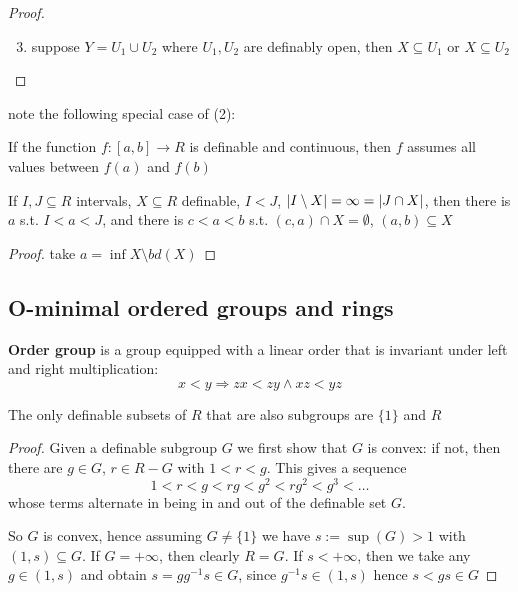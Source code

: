 \documentclass[11pt]{article}
\begin{document}
\begin{proof}
\begin{enumerate}
\setcounter{enumi}{2}
\item suppose \(Y=U_1\cup U_2\) where \(U_1,U_2\) are definably open, then \(X\subseteq U_1\) or \(X\subseteq U_2\)
\end{enumerate}
\end{proof}

note the following special case of (2):
\begin{center}
If the function \(f:[a,b]\to R\) is definable and continuous, then \(f\) assumes all values
between \(f(a)\) and \(f(b)\)
\end{center}

\begin{lemma}[]
If \(I,J\subseteq R\) intervals, \(X\subseteq R\) definable, \(I<J\), \(\abs{I\setminus X}=\infty=\abs{J\cap X}\), then there
is \(a\) s.t. \(I<a<J\), and there is \(c<a<b\) s.t. \((c,a)\cap X=\emptyset\), \((a,b)\subseteq X\)
\end{lemma}

\begin{proof}
take \(a=\inf X\setminus bd(X)\)
\end{proof}
\subsection{O-minimal ordered groups and rings}
\label{sec:org8ea482e}
\textbf{Order group} is a group equipped with a linear order that is invariant under left and right
 multiplication:
 \begin{equation*}
x<y\Rightarrow zx<zy\wedge xz<yz
 \end{equation*}

\begin{lemma}[]
The only definable subsets of \(R\) that are also subgroups are \(\{1\}\) and \(R\)
\end{lemma}

\begin{proof}
Given a definable subgroup \(G\) we first show that \(G\) is convex: if not, then there
are \(g\in G\), \(r\in R-G\) with \(1<r<g\). This gives a sequence
 \begin{equation*}
1<r<g<rg<g^2<rg^2<g^3<\dots
 \end{equation*}
whose terms alternate in being in and out of the definable set \(G\).

So \(G\) is convex, hence assuming \(G\neq\{1\}\) we have \(s:=\sup(G)>1\) with \((1,s)\subseteq G\).
If \(G=+\infty\), then clearly \(R=G\). If \(s<+\infty\), then we take any \(g\in(1,s)\) and
obtain \(s=gg^{-1}s\in G\), since \(g^{-1}s\in(1,s)\) hence \(s<gs\in G\)
\end{proof}
\end{document}
